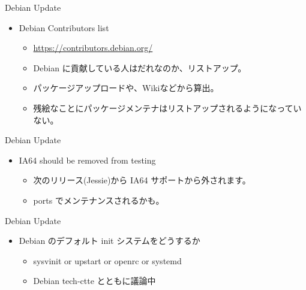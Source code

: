 \begin{frame}{Debian Update}
\begin{itemize}
\item Debian Contributors list \\
\begin{itemize}
\item \url{https://contributors.debian.org/} \\
\item Debian に貢献している人はだれなのか、リストアップ。\\
\item パッケージアップロードや、Wikiなどから算出。\\
\item 残絵なことにパッケージメンテナはリストアップされるようになっていない。
\end{itemize}
\end{itemize}
\end{frame}

\begin{frame}{Debian Update}

\begin{itemize}
\item IA64 should be removed from testing\\
\begin{itemize}
\item 次のリリース(Jessie)から IA64 サポートから外されます。\\
\item ports でメンテナンスされるかも。
\end{itemize}
\end{itemize}

\end{frame}

\begin{frame}{Debian Update}

\begin{itemize}
\item Debian のデフォルト init システムをどうするか\\
\begin{itemize}
\item sysvinit or upstart or openrc or systemd \\
\item Debian tech-ctte とともに議論中\\
\end{itemize}
\end{itemize}

\end{frame}

